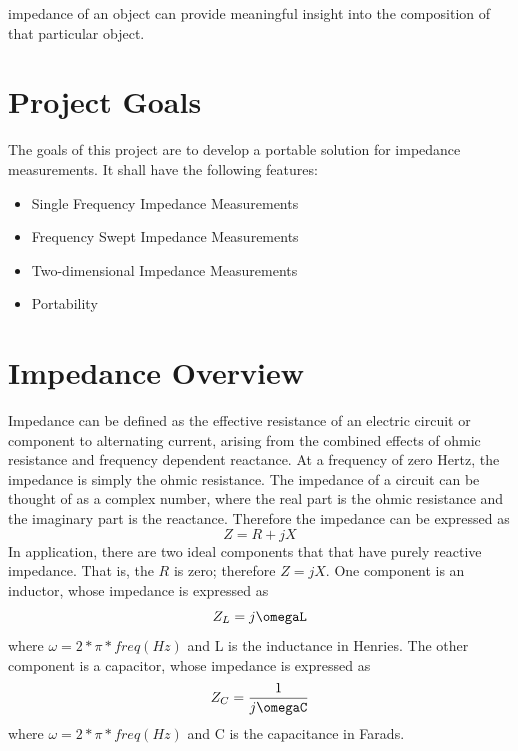 \documentclass[]{IEEEtran}
\begin{document}
 impedance of an object can provide meaningful insight into the composition of that particular object. 
\newline 


\section{Project Goals}
The goals of this project are to develop a portable solution for impedance measurements. It shall have the following features:
\begin{itemize}
\item{Single Frequency Impedance Measurements}%
\item{Frequency Swept Impedance Measurements}
\item{Two-dimensional Impedance Measurements}
\item{Portability}
\end{itemize}


\section{Impedance Overview}
Impedance can be defined as the effective resistance of an electric circuit or component to alternating current, arising from the combined effects of ohmic resistance and frequency dependent reactance. At a frequency of zero Hertz, the impedance is simply the ohmic resistance. The impedance of a circuit can be thought of as a complex number, where the real part is the ohmic resistance and the imaginary part is the reactance. Therefore the impedance can be expressed as \[Z=R+jX\]In application, there are two ideal components that that have purely reactive impedance. That is, the \(R\) is zero; therefore \(Z=jX\). One component is an inductor, whose impedance is expressed as \[Z_L=j\omegaL\] where \(\omega=2*\pi*freq(Hz)\) and L is the inductance in Henries. The other component is a capacitor, whose impedance is expressed as \[Z_C=\frac{1}{j\omegaC}\] where \(\omega=2*\pi*freq(Hz)\) and C is the capacitance in Farads.\newline
\end{document}
